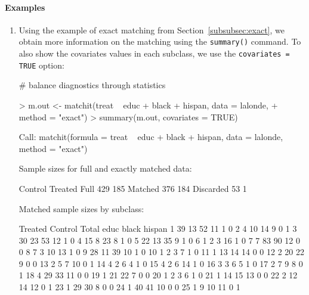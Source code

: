 \documentclass[oneside,letterpaper,titlepage]{article}
\begin{document}
\paragraph{Examples}
\begin{enumerate}
\item Using the example of exact matching from
  Section~\ref{subsubsec:exact}, we obtain more information on the
  matching using the {\tt summary()} command.  To also show the
  covariates values in each subclass, we use the \texttt{covariates =
    TRUE} option:

\# balance diagnostics through statistics
\begin{Schunk}
\begin{Sinput}
> m.out <- matchit(treat ~ educ + black + hispan, data = lalonde, 
+     method = "exact")
> summary(m.out, covariates = TRUE)
\end{Sinput}
\begin{Soutput}
Call:
matchit(formula = treat ~ educ + black + hispan, data = lalonde,     method = "exact")


Sample sizes for full and exactly matched data:

          Control Treated
Full          429     185
Matched       376     184
Discarded      53       1

Matched sample sizes by subclass:

   Treated Control Total educ black hispan
1       39      13    52   11     1      0
2        4      10    14    9     0      1
3       30      23    53   12     1      0
4       15       8    23    8     1      0
5       22      13    35    9     1      0
6        1       2     3   16     1      0
7        7      83    90   12     0      0
8        7       3    10   13     1      0
9       28      11    39   10     1      0
10       1       2     3    7     1      0
11       1      13    14   14     0      0
12       2      20    22    9     0      0
13       2       5     7   10     0      1
14       4       2     6    4     1      0
15       4       2     6   14     1      0
16       3       3     6    5     1      0
17       2       7     9    8     0      1
18       4      29    33   11     0      0
19       1      21    22    7     0      0
20       1       2     3    6     1      0
21       1      14    15   13     0      0
22       2      12    14   12     0      1
23       1      29    30    8     0      0
24       1      40    41   10     0      0
25       1       9    10   11     0      1
\end{Soutput}
\end{Schunk}


\end{enumerate}
\end{document}
